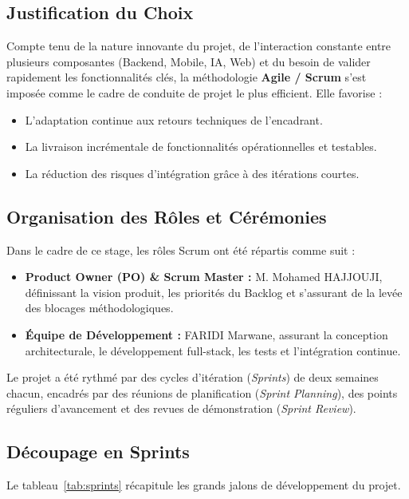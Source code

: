 \documentclass[12pt,a4paper,twoside,openright]{report}
\newcommand{\itembullet}{\textcolor{secondaryBlue}{$\blacktriangleright$}}
\begin{document}
  \subsection{Justification du Choix}
  Compte tenu de la nature innovante du projet, de l'interaction constante entre plusieurs composantes (Backend, Mobile, IA, Web) et du besoin de valider rapidement les fonctionnalit\'es cl\'es, la m\'ethodologie \textbf{Agile / Scrum} s'est impos\'ee comme le cadre de conduite de projet le plus efficient. Elle favorise :
  \begin{itemize}[label=\itembullet]
    \item L'adaptation continue aux retours techniques de l'encadrant.
    \item La livraison incr\'ementale de fonctionnalit\'es op\'erationnelles et testables.
    \item La r\'eduction des risques d'int\'egration gr\^ace \`a des it\'erations courtes.
  \end{itemize}

  \subsection{Organisation des R\^oles et C\'er\'emonies}
  Dans le cadre de ce stage, les r\^oles Scrum ont \'et\'e r\'epartis comme suit :
  \begin{itemize}[label=\itembullet]
    \item \textbf{Product Owner (PO) \& Scrum Master :} M. Mohamed HAJJOUJI, d\'efinissant la vision produit, les priorit\'es du Backlog et s'assurant de la lev\'ee des blocages m\'ethodologiques.
    \item \textbf{\'Equipe de D\'eveloppement :} FARIDI Marwane, assurant la conception architecturale, le d\'eveloppement full-stack, les tests et l'int\'egration continue.
  \end{itemize}

  Le projet a \'et\'e rythm\'e par des cycles d'it\'eration (\textit{Sprints}) de deux semaines chacun, encadr\'es par des r\'eunions de planification (\textit{Sprint Planning}), des points r\'eguliers d'avancement et des revues de d\'emonstration (\textit{Sprint Review}).

  \subsection{D\'ecoupage en Sprints}
  Le tableau~\ref{tab:sprints} r\'ecapitule les grands jalons de d\'eveloppement du projet.
\end{document}
